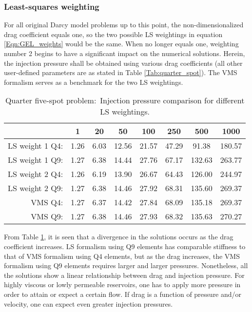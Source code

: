 \documentclass[11pt,reqno]{amsart}
\begin{document}
\subsubsection{Least-squares weighting}
For all original Darcy model problems up to this point, the non-dimensionalized drag 
coefficient equals one, so the two possible LS weightings  in equation 
\eqref{Eqn:GEL_weights} would be the same. When  
no longer equals one, weighting number 2 begins to have a significant impact on the 
numerical solutions. Herein, the injection pressure shall be obtained using various 
drag coefficients (all other user-defined parameters are as stated in Table 
\ref{Tab:quarter_spot}). The VMS formalism serves as a benchmark for the two LS 
weightings.
\begin{table}[t!]
  \centering
  \caption{Quarter five-spot problem:~Injection pressure comparison for different LS weightings.}
  \begin{tabular}{rccccccc}
      \hline
       & 1 & 20 & 50 & 100 & 250 & 500 & 1000\\
      \hline
      LS weight 1 Q4: & 1.26 & 6.03 & 12.56 & 21.57 & 47.29 & 91.38 & 180.57 \\
      LS weight 1 Q9: & 1.27 & 6.38 & 14.44 & 27.76 & 67.17 & 132.63 & 263.77 \\
      LS weight 2 Q4: & 1.26 & 6.19 & 13.90 & 26.67 & 64.43 & 126.00 & 244.97 \\
      LS weight 2 Q9: & 1.27 & 6.38 & 14.46 & 27.92 & 68.31 & 135.60 & 269.37 \\
      VMS Q4: & 1.27 & 6.37 & 14.42 & 27.84 & 68.09 & 135.18 & 269.37 \\
      VMS Q9: & 1.27 & 6.38 & 14.46 & 27.93 & 68.32 & 135.63 & 270.27 \\
      \hline
  \end{tabular}
  \label{Tab:five_spot_weighting_compare}
\end{table}
From Table \ref{Tab:five_spot_weighting_compare}, it is seen that a divergence in the 
solutions occurs as the drag coefficient increases. LS formalism using Q9 elements has 
comparable stiffness to that of VMS formalism using Q4 elements, but as the drag 
increases, the VMS formalism using Q9 elements requires larger and larger pressures. 
Nonetheless, all the solutions show a linear relationship between drag and injection 
pressure. For highly viscous or lowly permeable reservoirs, one has to apply more pressure 
in order to attain or expect a certain flow. If drag is a function of pressure and/or 
velocity, one can expect even greater injection pressures.
\end{document}
